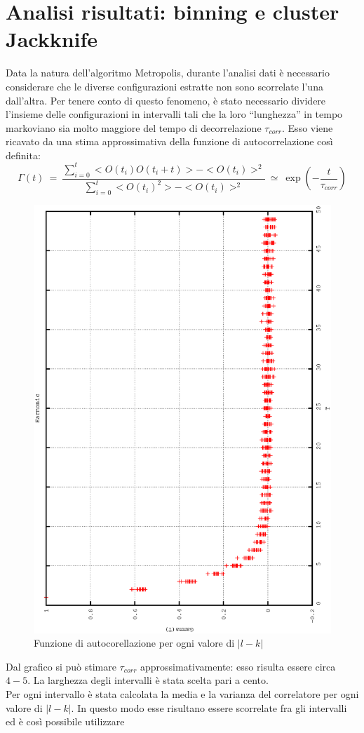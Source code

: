 \section{Analisi risultati: binning e cluster Jackknife}
Data la natura dell'algoritmo Metropolis, durante l'analisi dati è necessario considerare che le diverse configurazioni estratte non sono scorrelate l'una dall'altra.
Per tenere conto di questo fenomeno, è stato necessario dividere l'insieme delle configurazioni in intervalli tali
che la loro ``lunghezza'' in tempo markoviano sia molto maggiore del tempo di decorrelazione $\tau_{corr}$. Esso viene ricavato da una stima approssimativa
della funzione di autocorrelazione così definita:
$$
\Gamma(t) \ = \  \frac{ \sum_{i=0}^t <O(t_i)O(t_i + t)> - <O(t_i)>^2}{\sum_{i=0}^t <{O(t_i)}^2> - <O(t_i)>^2} \ \simeq \ \exp{\left(-\frac{t}{\tau_{corr}}\right)}
$$
\begin{figure}[ht]
\centering
  \includegraphics[width= 0.7\columnwidth,angle = -90]{gamma_t.eps}
  \caption{\small{Funzione di autocorellazione per ogni valore di $|l-k|$}}
  \end{figure}
Dal grafico si può stimare $\tau_{corr}$ approssimativamente: esso risulta essere circa $4-5$. La larghezza degli intervalli è stata scelta pari a cento.\\
Per ogni intervallo è stata calcolata la media e la varianza del correlatore per ogni valore di $|l-k|$. In questo modo esse risultano essere scorrelate fra gli intervalli ed è così possibile utilizzare

